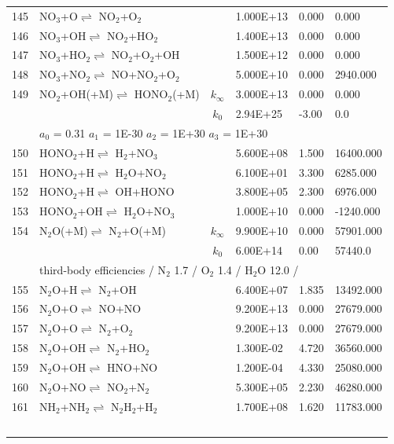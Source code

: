 \documentclass[11pt]{article}
\begin{document}
\begin{table}[hbt]
\begin{tabular}{|r l c l l l|}
145 &	NO$_{3}$+O$\rightleftharpoons$ NO$_{2}$+O$_{2}$&	&	1.000E+13&	0.000&	0.000\\ 
146 &	NO$_{3}$+OH$\rightleftharpoons$ NO$_{2}$+HO$_{2}$&	&	1.400E+13&	0.000&	0.000\\ 
147 &	NO$_{3}$+HO$_{2}$$\rightleftharpoons$ NO$_{2}$+O$_{2}$+OH&	&	1.500E+12&	0.000&	0.000\\ 
148 &	NO$_{3}$+NO$_{2}$$\rightleftharpoons$ NO+NO$_{2}$+O$_{2}$&	&	5.000E+10&	0.000&	2940.000\\ 
149 &	NO$_{2}$+OH(+M)$\rightleftharpoons$ HONO$_{2}$(+M)&	$k_{\infty}$&	3.000E+13&	0.000&	0.000\\ 
	&	&	$k_0$&	2.94E+25&-3.00&	    0.0\\ 
	&\multicolumn{5}{l|}{	$a_0$ = 0.31	$a_1$ = 1E-30	$a_2$ = 1E+30	$a_3$ = 1E+30}\\ 
150 &	HONO$_{2}$+H$\rightleftharpoons$ H$_{2}$+NO$_{3}$&	&	5.600E+08&	1.500&	16400.000\\ 
151 &	HONO$_{2}$+H$\rightleftharpoons$ H$_{2}$O+NO$_{2}$&	&	6.100E+01&	3.300&	6285.000\\ 
152 &	HONO$_{2}$+H$\rightleftharpoons$ OH+HONO&	&	3.800E+05&	2.300&	6976.000\\ 
153 &	HONO$_{2}$+OH$\rightleftharpoons$ H$_{2}$O+NO$_{3}$&	&	1.000E+10&	0.000&	-1240.000\\ 
154 &	N$_{2}$O(+M)$\rightleftharpoons$ N$_{2}$+O(+M)&	$k_{\infty}$&	9.900E+10&	0.000&	57901.000\\ 
	&	&	$k_0$&	6.00E+14& 0.00&	57440.0\\ 
	&\multicolumn{5}{l|}{third-body efficiencies  / N$_{2}$ 1.7 / O$_{2}$ 1.4 / H$_{2}$O 12.0 /}\\ 
155 &	N$_{2}$O+H$\rightleftharpoons$ N$_{2}$+OH&	&	6.400E+07&	1.835&	13492.000\\ 
156 &	N$_{2}$O+O$\rightleftharpoons$ NO+NO&	&	9.200E+13&	0.000&	27679.000\\ 
157 &	N$_{2}$O+O$\rightleftharpoons$ N$_{2}$+O$_{2}$&	&	9.200E+13&	0.000&	27679.000\\ 
158 &	N$_{2}$O+OH$\rightleftharpoons$ N$_{2}$+HO$_{2}$&	&	1.300E-02&	4.720&	36560.000\\ 
159 &	N$_{2}$O+OH$\rightleftharpoons$ HNO+NO&	&	1.200E-04&	4.330&	25080.000\\ 
160 &	N$_{2}$O+NO$\rightleftharpoons$ NO$_{2}$+N$_{2}$&	&	5.300E+05&	2.230&	46280.000\\ 
161 &	NH$_{2}$+NH$_{2}$$\rightleftharpoons$ N$_{2}$H$_{2}$+H$_{2}$&	&	1.700E+08&	1.620&	11783.000\\ 
$$
\end{tabular}
\end{table}
\end{document}
